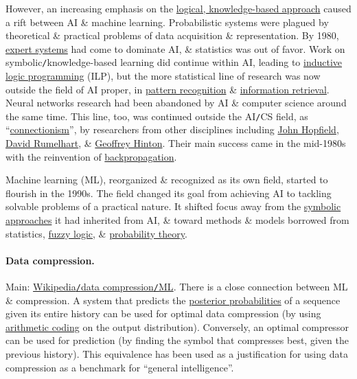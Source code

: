 \documentclass{article}
\begin{document}
However, an increasing emphasis on the \href{https://en.wikipedia.org/wiki/Symbolic_AI}{logical, knowledge-based approach} caused a rift between AI \& machine learning. Probabilistic systems were plagued by theoretical \& practical problems of data acquisition \& representation. By 1980, \href{https://en.wikipedia.org/wiki/Expert_system}{expert systems} had come to dominate AI, \& statistics was out of favor. Work on symbolic{\tt/}knowledge-based learning did continue within AI, leading to \href{https://en.wikipedia.org/wiki/Inductive_logic_programming}{inductive logic programming} (ILP), but the more statistical line of research was now outside the field of AI proper, in \href{https://en.wikipedia.org/wiki/Pattern_recognition}{pattern recognition} \& \href{https://en.wikipedia.org/wiki/Information_retrieval}{information retrieval}. Neural networks research had been abandoned by AI \& computer science around the same time. This line, too, was continued outside the AI{\tt/}CS field, as ``\href{https://en.wikipedia.org/wiki/Connectionism}{connectionism}'', by researchers from other disciplines including \href{https://en.wikipedia.org/wiki/John_Hopfield}{John Hopfield}, \href{https://en.wikipedia.org/wiki/David_Rumelhart}{David Rumelhart}, \& \href{https://en.wikipedia.org/wiki/Geoffrey_Hinton}{Geoffrey Hinton}. Their main success came in the mid-1980s with the reinvention of \href{https://en.wikipedia.org/wiki/Backpropagation}{backpropagation}.

Machine learning (ML), reorganized \& recognized as its own field, started to flourish in the 1990s. The field changed its goal from achieving AI to tackling solvable problems of a practical nature. It shifted focus away from the \href{https://en.wikipedia.org/wiki/Symbolic_artificial_intelligence}{symbolic approaches} it had inherited from AI, \& toward methods \& models borrowed from statistics, \href{https://en.wikipedia.org/wiki/Fuzzy_logic}{fuzzy logic}, \& \href{https://en.wikipedia.org/wiki/Probability_theory}{probability theory}.

\paragraph{Data compression.} Main: \href{https://en.wikipedia.org/wiki/Data_compression#Machine_learning}{Wikipedia{\tt/}data compression{\tt/}ML}. There is a close connection between ML \& compression. A system that predicts the \href{https://en.wikipedia.org/wiki/Posterior_probabilities}{posterior probabilities} of a sequence given its entire history can be used for optimal data compression (by using \href{https://en.wikipedia.org/wiki/Arithmetic_coding}{arithmetic coding} on the output distribution). Conversely, an optimal compressor can be used for prediction (by finding the symbol that compresses best, given the previous history). This equivalence has been used as a justification for using data compression as a benchmark for ``general intelligence''.
\end{document}
